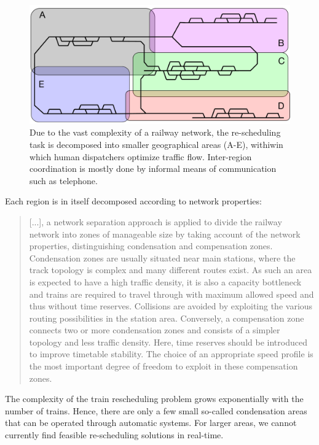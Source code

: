 \documentclass{article}
\begin{document}
%
\begin{figure}[hbtp]
	\centering
  \includegraphics[width=\textwidth]{Figures/disposition_areas.pdf}
	\caption{Due to the vast complexity of a railway network, the re-scheduling task is decomposed into smaller geographical areas (A-E), withiwin which human dispatchers optimize traffic flow. Inter-region coordination is mostly done by informal means of communication such as telephone.}
	\label{fig:geographical_decomposition}
\end{figure}
%

Each region is in itself decomposed according to network properties:

%
\begin{quote}
    [...], a network separation approach is applied to divide the railway network into zones of manageable size by taking account of the network properties, distinguishing condensation and compensation zones. Condensation zones are usually situated near main stations, where the track topology is complex and many different routes exist. As such an area is expected to have a high traffic density, it is also a capacity bottleneck and trains are required to travel through with maximum allowed speed and thus without time reserves. Collisions are avoided by exploiting the various routing possibilities in the station area. Conversely, a compensation zone connects two or more condensation zones and consists of a simpler topology and less traffic density. Here, time reserves should be introduced to improve timetable stability. The choice of an appropriate speed profile is the most important degree of freedom to exploit in these compensation zones. \cite{caimi2009}
\end{quote}

 The complexity of the train rescheduling problem grows exponentially with the number of trains. Hence, there are only a few small so-called condensation areas \cite{caimi2009} that can be operated through automatic systems. For larger areas, we cannot currently find feasible re-scheduling solutions in real-time.
\end{document}
